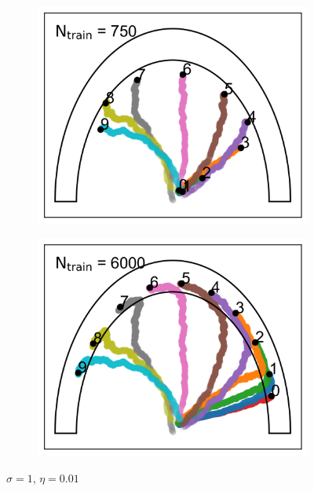 \documentclass[aps,prb,twocolumn,superscriptaddress,floatfix,longbibliography]{revtex4-2}
\begin{document}
\begin{figure}
\begin{subfigure}[b]{0.24\textwidth}
      \centering
      \includegraphics[width=\textwidth]{ej2_fig3_3.png}
      \caption{\label{fig:ej2_fig3_3}}
  \end{subfigure}
  \hfill
  \begin{subfigure}[b]{0.24\textwidth}
      \centering
      \includegraphics[width=\textwidth]{ej2_fig3_4.png}
      \caption{\label{fig:ej2_fig3_4}}
  \end{subfigure}
     \caption{$\sigma = 1$, $\eta = 0.01$}
     \label{fig:ej2_fig3}
\end{figure}
\end{document}
